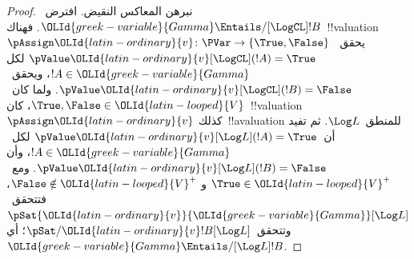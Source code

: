 \documentclass[../../../include/open-logic-section]{subfiles}
\begin{document}
\begin{proof}
  نبرهن المعاكس النقيض. افترض~$\OLId{greek-variable}{Gamma} \Entails/[\LogCL] !B$.
  فهناك~!!{valuation}~$\pAssign \OLId{latin-ordinary}{v}\colon \PVar \to
  \{\True, \False\}$ يحقق~$\pValue \OLId{latin-ordinary}{v}[\LogCL](!A) = \True$ لكل
  $!A \in \OLId{greek-variable}{Gamma}$، ويحقق~$\pValue \OLId{latin-ordinary}{v}[\LogCL](!B) = \False$.
  ولما كان~$\True, \False \in \OLId{latin-looped}{V}$، كان~!!{valuation}~$\pAssign \OLId{latin-ordinary}{v}$
  كذلك~!!a{valuation} للمنطق~$\Log L$. ثم تفيد 
  أن~$\pValue \OLId{latin-ordinary}{v}[\Log L](!A) = \True$ لكل~$!A \in \OLId{greek-variable}{Gamma}$، وأن
  $\pValue \OLId{latin-ordinary}{v}[\Log L](!B) = \False$. ومع~$\True \in \OLId{latin-looped}{V}^+$ و
  $\False \notin \OLId{latin-looped}{V}^+$، فتتحقق~$\pSat{\OLId{latin-ordinary}{v}}{\OLId{greek-variable}{Gamma}}[\Log L]$
  وتتحقق~$\pSat/{\OLId{latin-ordinary}{v}}{!B}[\Log L]$؛ أي
  $\OLId{greek-variable}{Gamma} \Entails/[\Log L] !B$.
\end{proof}
\end{document}
